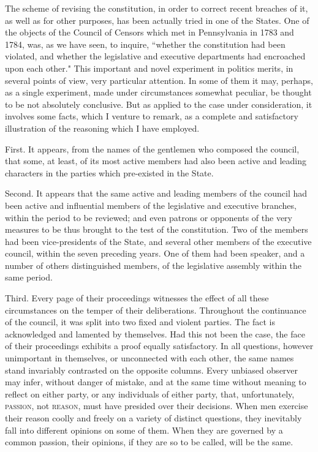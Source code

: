 The scheme of revising the constitution, in order to correct recent breaches of it, as well as for other purposes, has been actually tried in one of the States. One of the objects of the Council of Censors which met in Pennsylvania in 1783 and 1784, was, as we have seen, to inquire, ``whether the constitution had been violated, and whether the legislative and executive departments had encroached upon each other." This important and novel experiment in politics merits, in several points of view, very particular attention. In some of them it may, perhaps, as a single experiment, made under circumstances somewhat peculiar, be thought to be not absolutely conclusive. But as applied to the case under consideration, it involves some facts, which I venture to remark, as a complete and satisfactory illustration of the reasoning which I have employed.

First. It appears, from the names of the gentlemen who composed the council, that some, at least, of its most active members had also been active and leading characters in the parties which pre-existed in the State.

Second. It appears that the same active and leading members of the council had been active and influential members of the legislative and executive branches, within the period to be reviewed; and even patrons or opponents of the very measures to be thus brought to the test of the constitution. Two of the members had been vice-presidents of the State, and several other members of the executive council, within the seven preceding years. One of them had been speaker, and a number of others distinguished members, of the legislative assembly within the same period.

Third. Every page of their proceedings witnesses the effect of all these circumstances on the temper of their deliberations. Throughout the continuance of the council, it was split into two fixed and violent parties. The fact is acknowledged and lamented by themselves. Had this not been the case, the face of their proceedings exhibits a proof equally satisfactory. In all questions, however unimportant in themselves, or unconnected with each other, the same names stand invariably contrasted on the opposite columns. Every unbiased observer may infer, without danger of mistake, and at the same time without meaning to reflect on either party, or any individuals of either party, that, unfortunately, \textsc{passion}, not \textsc{reason}, must have presided over their decisions. When men exercise their reason coolly and freely on a variety of distinct questions, they inevitably fall into different opinions on some of them. When they are governed by a common passion, their opinions, if they are so to be called, will be the same.

